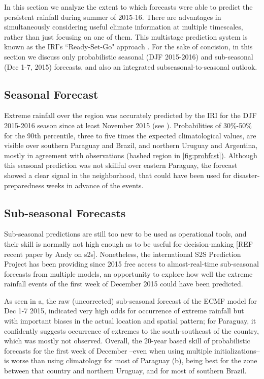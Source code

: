 \documentclass{ametsoc}
\begin{document}
In this section we analyze the extent to which forecasts were able to predict the persistent rainfall during summer of 2015-16. There are advantages in simultaneously considering useful climate information at multiple timescales, rather than just focusing on one of them. This multistage prediction system is known as the IRI's ``Ready-Set-Go" approach \citep{Goddard:2014kf,Munoz2016}.
For the sake of concision, in this section we discuss only probabilistic seasonal (DJF 2015-2016) and sub-seasonal (Dec 1-7, 2015) forecasts, and also an integrated subseasonal-to-seasonal outlook.

\subsection{Seasonal Forecast}

Extreme rainfall over the region was accurately predicted by the IRI for the DJF 2015-2016 season since at least November 2015 (see ). Probabilities of 30\%-50\% for the 90th percentile, three to five times the expected climatological values, are visible over southern Paraguay and Brazil, and northern Uruguay and Argentina, mostly in agreement with observations (hashed region in \cref{fig:probfcst}).
Although this seasonal prediction was not skillful over eastern Paraguay, the forecast  showed a clear signal in the neighborhood, that could have been used for disaster-preparedness weeks in advance of the events.

\subsection{Sub-seasonal Forecasts}
Sub-seasonal predictions are still too new to be used as operational tools, and their skill is normally not high enough as to be useful for decision-making [REF recent paper by Andy on s2s]. Nonetheless, the international S2S Prediction Project \citep{Vitart2016} has been providing since 2015 free access to almost-real-time sub-seasonal forecasts from multiple models, an opportunity to explore how well the extreme rainfall events of the first week of December 2015 could have been predicted.

As seen in a, the raw (uncorrected) sub-seasonal forecast of the ECMF model for Dec 1-7 2015, indicated very high odds for occurrence of extreme rainfall but with important biases in the actual location and spatial pattern; for Paraguay, it confidently suggests occurrence of extremes to the south-southeast of the country, which was mostly not observed. Overall, the 20-year based skill of probabilistic forecasts for the first week of December --even when using multiple initializations-- is worse than using climatology for most of Paraguay (b), being best for the zone between that country and northern Uruguay, and for most of southern Brazil.
\end{document}
